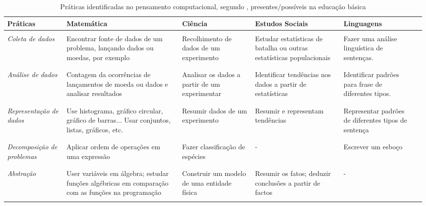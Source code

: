 
\begin{table}[!htb]
  \caption{Práticas identificadas no pensamento computacional, segundo ,  presentes/possíveis na educação básica}
  \label{tab:barr-1}

  \begin{center}
    \begin{tabularx}{\textwidth}{@{}YYYYYY@{}}
      \hline 
      \textbf{Práticas} & \textbf{Matemática} & \textbf{Ciência} & \textbf{Estudos Sociais} & \textbf{Linguagens} \\

      \hline
      \\
      \textit{Coleta de   dados} & Encontrar fonte de dados de um problema, lançando dados ou moedas, por exemplo & Recolhimento de dados de um
      experimento & Estudar estatísticas de batalha ou outras estatísticas populacionais & Fazer uma análise linguística
      de sentenças. \\ \\

      \hline
      \\
      \textit{Análise de dados} & Contagem da ocorrências de lançamentos de moeda ou dados e analisar resultados & Analisar os dados a partir de um experimentar & Identificar tendências nos dados a partir de estatísticas & Identificar padrões para frase de diferentes tipos. \\ \\
      
      \hline
      \\
      \textit{ Representação de dados} & Use histograma, gráfico circular, gráfico de barras... Usar conjuntos, listas, gráficos, etc. & Resumir dados de um experimento & Resumir e representam tendências & Representar padrões de diferentes tipos de sentença \\ \\

      \hline
      \\
      \textit{Decomposição de problemas} & Aplicar ordem de operações em uma
      expressão & Fazer classificação de espécies & - & Escrever um esboço \\ \\ 

      \hline
      \\
      \textit{Abstração} & User variáveis em álgebra; estudar funções algébricas em comparação com as funções na programação & Construir um modelo de uma entidade física & Resumir os fatos; deduzir conclusões a partir de factos & - \\ \\%
      \hline
    \end{tabularx}
  \end{center}
\end{table}

